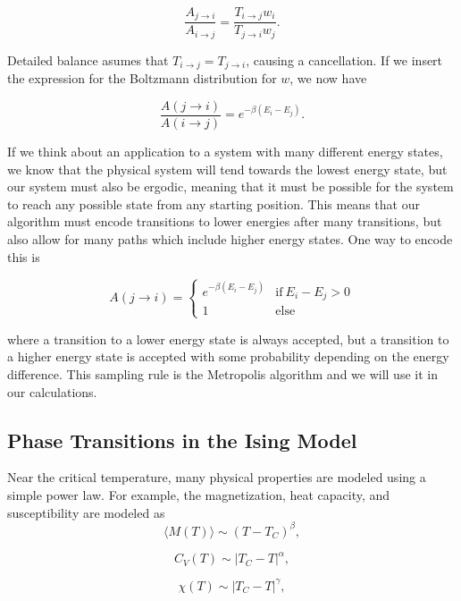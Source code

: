 \documentclass[%
oneside,                 %
final,                   %
10pt]{article}
\begin{document}
\begin{equation*}
\frac{A_{j \rightarrow i}}{A_{i \rightarrow j}}=\frac{T_{i \rightarrow j}w_i}{ T_{j \rightarrow i}w_j}.
\end{equation*}

Detailed balance asumes that $T_{i \rightarrow j}=T_{j \rightarrow i}$, causing a cancellation.  If we insert the expression for the Boltzmann distribution for $w$, we now have

\begin{equation*}
\frac{A(j \rightarrow i)}{A(i \rightarrow j)}=e^{-\beta (E_i-E_j)}.
\end{equation*}

If we think about an application to a system with many different energy states, we know that the physical system will tend towards the lowest energy state, but our system must also be ergodic, meaning that it must be possible for the system to reach any possible state from any starting position.  This means that our algorithm must encode transitions to lower energies after many transitions, but also allow for many paths which include higher energy states.  One way to encode this is

\begin{equation*}
A(j \rightarrow i) = \begin{cases}
e^{-\beta(E_i-E_j)} & \text{if} \ E_i-E_j > 0 \\
1 & \text{else}
\end{cases}
\end{equation*}

where a transition to a lower energy state is always accepted, but a transition to a higher energy state is accepted with some probability depending on the energy difference.  This sampling rule is the Metropolis algorithm and we will use it in our calculations.

\subsection{Phase Transitions in the Ising Model}

Near the critical temperature, many physical properties are modeled using a simple power law.  For example, the magnetization, heat capacity, and susceptibility are modeled as 
\[
  \langle M(T) \rangle \sim \left(T-T_C\right)^{\beta},
\]

\[
  C_V(T) \sim \left|T_C-T\right|^{\alpha},
\]

\[
  \chi(T) \sim \left|T_C-T\right|^{\gamma},
\]
\end{document}
